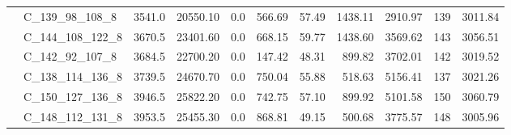 \begin{tabular}{llrrrrrrrrr}
      & C\_139\_98\_108\_8 &  3541.0 &  20550.10 &  0.0 &   566.69 &    57.49 &  1438.11 &  2910.97 &         139 &  3011.84 \\
      & C\_144\_108\_122\_8 &  3670.5 &  23401.60 &  0.0 &   668.15 &    59.77 &  1438.60 &  3569.62 &         143 &  3056.51 \\
      & C\_142\_92\_107\_8 &  3684.5 &  22700.20 &  0.0 &   147.42 &    48.31 &   899.82 &  3702.01 &         142 &  3019.52 \\
      & C\_138\_114\_136\_8 &  3739.5 &  24670.70 &  0.0 &   750.04 &    55.88 &   518.63 &  5156.41 &         137 &  3021.26 \\
      & C\_150\_127\_136\_8 &  3946.5 &  25822.20 &  0.0 &   742.75 &    57.10 &   899.92 &  5101.58 &         150 &  3060.79 \\
      & C\_148\_112\_131\_8 &  3953.5 &  25455.30 &  0.0 &   868.81 &    49.15 &   500.68 &  3775.57 &         148 &  3005.96 \\
\bottomrule
\end{tabular}

